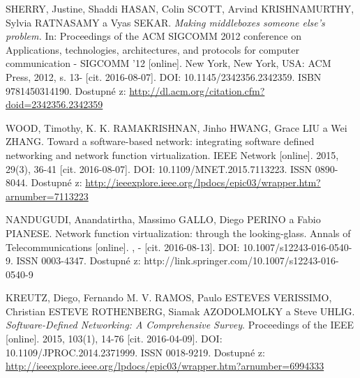 \begin{thebibliography}{10}

SHERRY, Justine, Shaddi HASAN, Colin SCOTT, Arvind KRISHNAMURTHY, Sylvia RATNASAMY a Vyas SEKAR. \emph{Making middleboxes someone else's problem.} In: Proceedings of the ACM SIGCOMM 2012 conference on Applications, technologies, architectures, and protocols for computer communication - SIGCOMM '12 [online]. New York, New York, USA: ACM Press, 2012, s. 13- [cit. 2016-08-07]. DOI: 10.1145/2342356.2342359. ISBN 9781450314190. Dostupné z: \url{http://dl.acm.org/citation.cfm?doid=2342356.2342359}

WOOD, Timothy, K. K. RAMAKRISHNAN, Jinho HWANG, Grace LIU a Wei ZHANG. Toward a software-based network: integrating software defined networking and network function virtualization. IEEE Network [online]. 2015, 29(3), 36-41 [cit. 2016-08-07]. DOI: 10.1109/MNET.2015.7113223. ISSN 0890-8044. Dostupné z: \url{http://ieeexplore.ieee.org/lpdocs/epic03/wrapper.htm?arnumber=7113223}

NANDUGUDI, Anandatirtha, Massimo GALLO, Diego PERINO a Fabio PIANESE. Network function virtualization: through the looking-glass. Annals of Telecommunications [online]. , - [cit. 2016-08-13]. DOI: 10.1007/s12243-016-0540-9. ISSN 0003-4347. Dostupné z: http://link.springer.com/10.1007/s12243-016-0540-9



KREUTZ, Diego, Fernando M. V. RAMOS, Paulo ESTEVES VERISSIMO, Christian ESTEVE ROTHENBERG, Siamak AZODOLMOLKY a Steve UHLIG. \emph{Software-Defined Networking: A Comprehensive Survey}. Proceedings of the IEEE [online]. 2015, 103(1), 14-76 [cit. 2016-04-09]. DOI: 10.1109/JPROC.2014.2371999. ISSN 0018-9219. Dostupné z: \url{http://ieeexplore.ieee.org/lpdocs/epic03/wrapper.htm?arnumber=6994333}



\end{thebibliography}